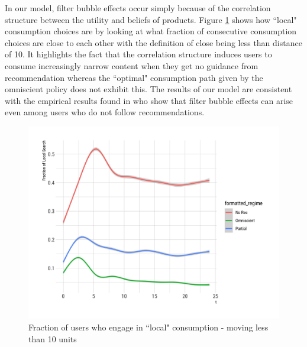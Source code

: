 \documentclass[sigconf]{acmart}
\begin{document}
In our model, filter bubble effects occur simply because of the correlation structure between the utility and beliefs of products. Figure \ref{fig:local_consumption} shows how ``local" consumption choices are by looking at what fraction of consecutive consumption choices are close to each other with the definition of close being less than distance of 10. It highlights the fact that the correlation structure induces users to consume increasingly narrow content when they get no guidance from recommendation whereas the ``optimal" consumption path given by the omniscient policy does not exhibit this. The results of our model are consistent with the empirical results found in \cite{nguyen2014exploring} who show that filter bubble effects can arise even among users who do not follow recommendations.
\begin{figure}
\includegraphics[scale=0.08]{figures/local_moves_25}
\caption{Fraction of users who engage in ``local" consumption - moving less than 10 units}
\label{fig:local_consumption}
\end{figure}
\end{document}
